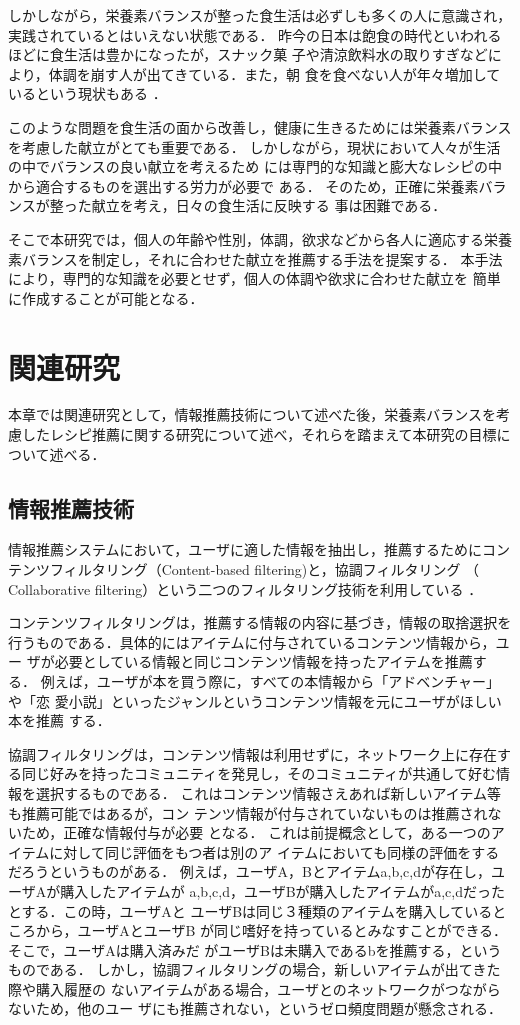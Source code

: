 \documentclass[11pt,titlepage,uplatex]{ujreport}
\begin{document}
しかしながら，栄養素バランスが整った食生活は必ずしも多くの人に意識され，
実践されているとはいえない状態である．
昨今の日本は飽食の時代といわれるほどに食生活は豊かになったが，スナック菓
子や清涼飲料水の取りすぎなどにより，体調を崩す人が出てきている．また，朝
食を食べない人が年々増加しているという現状もある \cite{jikkyo10}．

このような問題を食生活の面から改善し，健康に生きるためには栄養素バランス
を考慮した献立がとても重要である．
しかしながら，現状において人々が生活の中でバランスの良い献立を考えるため
には専門的な知識と膨大なレシピの中から適合するものを選出する労力が必要で
ある．
そのため，正確に栄養素バランスが整った献立を考え，日々の食生活に反映する
事は困難である．

そこで本研究では，個人の年齢や性別，体調，欲求などから各人に適応する栄養
素バランスを制定し，それに合わせた献立を推薦する手法を提案する．
本手法により，専門的な知識を必要とせず，個人の体調や欲求に合わせた献立を
簡単に作成することが可能となる．

\chapter{関連研究}
本章では関連研究として，情報推薦技術について述べた後，栄養素バランスを考
慮したレシピ推薦に関する研究について述べ，それらを踏まえて本研究の目標に
ついて述べる．

\section{情報推薦技術}
情報推薦システムにおいて，ユーザに適した情報を抽出し，推薦するためにコン
テンツフィルタリング（Content-based filtering)と，協調フィルタリング
（ Collaborative filtering）という二つのフィルタリング技術を利用している
\cite{hijikata04}．

コンテンツフィルタリングは，推薦する情報の内容に基づき，情報の取捨選択を
行うものである．具体的にはアイテムに付与されているコンテンツ情報から，ユー
ザが必要としている情報と同じコンテンツ情報を持ったアイテムを推薦する．
例えば，ユーザが本を買う際に，すべての本情報から「アドベンチャー」や「恋
愛小説」といったジャンルというコンテンツ情報を元にユーザがほしい本を推薦
する．

協調フィルタリングは，コンテンツ情報は利用せずに，ネットワーク上に存在す
る同じ好みを持ったコミュニティを発見し，そのコミュニティが共通して好む情
報を選択するものである．
これはコンテンツ情報さえあれば新しいアイテム等も推薦可能ではあるが，コン
テンツ情報が付与されていないものは推薦されないため，正確な情報付与が必要
となる．
これは前提概念として，ある一つのアイテムに対して同じ評価をもつ者は別のア
イテムにおいても同様の評価をするだろうというものがある．
例えば，ユーザA，Bとアイテムa,b,c,dが存在し，ユーザAが購入したアイテムが
a,b,c,d，ユーザBが購入したアイテムがa,c,dだったとする．この時，ユーザAと
ユーザBは同じ３種類のアイテムを購入しているところから，ユーザAとユーザB
が同じ嗜好を持っているとみなすことができる．そこで，ユーザAは購入済みだ
がユーザBは未購入であるbを推薦する，というものである．
しかし，協調フィルタリングの場合，新しいアイテムが出てきた際や購入履歴の
ないアイテムがある場合，ユーザとのネットワークがつながらないため，他のユー
ザにも推薦されない，というゼロ頻度問題が懸念される．
\end{document}
